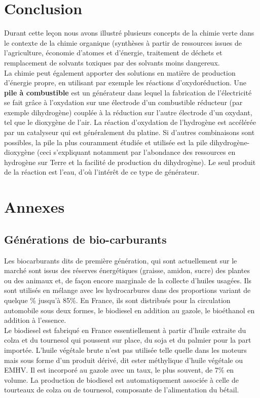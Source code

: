 \documentclass[11pt,a4paper]{report}
\begin{document}
\section*{Conclusion}

Durant cette leçon nous avons illustré plusieurs concepts de la chimie verte dans le contexte de la chimie organique (synthèses à partir de ressources issues de l'agriculture, économie d'atomes et d'énergie, traitement de déchets et remplacement de solvants toxiques par des solvants moins dangereux.\\

La chimie peut également apporter des solutions en matière de production d'énergie propre, en utilisant par exemple les réactions d'oxydoréduction. Une \textbf{pile à combustible} est un générateur dans lequel la fabrication de l'électricité se fait grâce à l'oxydation sur une électrode d'un combustible réducteur (par exemple dihydrogène) couplée à la réduction sur l'autre électrode d'un oxydant, tel que le dioxygène de l'air. La réaction d'oxydation de l'hydrogène est accélérée par un catalyseur qui est généralement du platine. Si d'autres combinaisons sont possibles, la pile la plus couramment étudiée et utilisée est la pile dihydrogène-dioxygène (ceci s'expliquant notamment par l'abondance des ressources en hydrogène sur Terre et la facilité de production du dihydrogène). Le seul produit de la réaction est l'eau, d'où l'intérêt de ce type de générateur.

\newpage
\section*{Annexes}

\subsection{Générations de bio-carburants}

Les biocarburants dits de première génération, qui sont actuellement sur le marché sont issus des réserves énergétiques (graisse, amidon, sucre) des plantes ou des animaux et, de façon encore marginale de la collecte d'huiles usagées. Ils sont utilisés en mélange avec les hydrocarbures dans des proportions variant de quelque \% jusqu'à 85\%. En France, ils sont distribués pour la circulation automobile sous deux formes, le biodiesel en addition au gazole, le bioéthanol en addition à l'essence. \\

Le biodiesel est fabriqué en France essentiellement à partir d'huile extraite du colza et du tournesol
qui poussent sur place, du soja et du palmier pour la part importée. L'huile végétale brute n'est pas
utilisée telle quelle dans les moteurs mais sous forme d'un produit dérivé, dit ester méthylique d'huile végétale ou EMHV. Il est incorporé au gazole avec un taux, le plus souvent, de 7\% en volume. La production de biodiesel est automatiquement associée à celle de tourteaux de colza ou de tournesol,
composante de l'alimentation du bétail.\\
\end{document}
